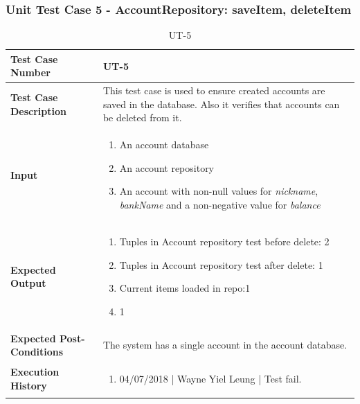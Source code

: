 \documentclass[12pt]{article}
\begin{document}
\subsubsection{Unit Test Case 5 - AccountRepository: saveItem, deleteItem}
\begin{table}[htbp]
\centering
\caption {UT-5}
\label{UT-5}
\begin{tabularx}{\textwidth}{ | l | X |}
\hline
\textbf{Test Case Number}      &  UT-5                     \\ \hline
\textbf{Test Case Description}    &  This test case is used to ensure created accounts are saved in the database. Also it verifies that accounts can be deleted from it.                 \\ \hline
\textbf{Input}         & 	\begin{enumerate}
  
\item An account database
\item An account repository
\item An account with non-null values for \textit{nickname}, \textit{bankName} and a non-negative value for \textit{balance}
  
\end{enumerate} \\ \hline

\textbf{Expected Output}     & \begin{enumerate}
\item Tuples in Account repository test before delete: 2 
\item Tuples in Account repository test after delete: 1 
\item Current items loaded in repo:1 
\item 1

\end{enumerate} \\ \hline
\textbf{Expected Post-Conditions} & The system has a single account in the account database. \\
\hline
\textbf{Execution History}   &  \begin{enumerate}
	\item 04/07/2018 | Wayne Yiel Leung | Test fail.
\end {enumerate} \\ \hline
\end{tabularx}
\end{table}
\clearpage

\end{document}
